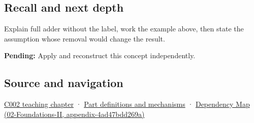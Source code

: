 \subsection{Recall and next depth}\label{appendix-d1a5b1e520c2-recall-and-next-depth}

Explain full adder without the label, work the example above, then state the assumption whose removal would change the result.

\textbf{Pending:} Apply and reconstruct this concept independently.

\subsection{Source and navigation}\label{appendix-d1a5b1e520c2-source-and-navigation}

\hyperref[01-foundations-i-ch001-arithmetic-becomes-a-policy]{C002 teaching chapter} · \hyperref[appendix-fd090d982a15]{Part definitions and mechanisms} · \href{../02-Foundations-II/main.pdf\#nameddest=appendix-4ad47bdd269a}{Dependency Map (02-Foundations-II, appendix-4ad47bdd269a)}
